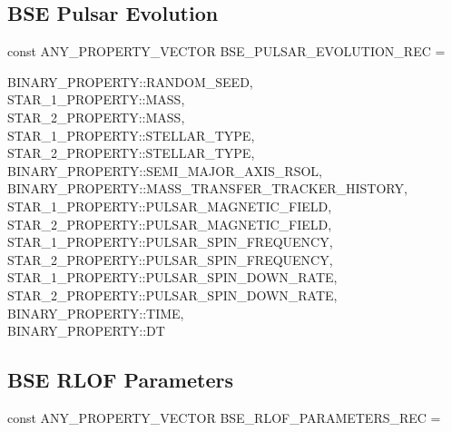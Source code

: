 \newpage
\subsection{BSE Pulsar Evolution}\label{sec:BSEPulsarEvolution}

const ANY\_PROPERTY\_VECTOR BSE\_PULSAR\_EVOLUTION\_REC = \lcb

\hfill
\begin{minipage}{\dimexpr\textwidth-2em}
    BINARY\_PROPERTY::RANDOM\_SEED, \\
    STAR\_1\_PROPERTY::MASS, \\
    STAR\_2\_PROPERTY::MASS, \\
    STAR\_1\_PROPERTY::STELLAR\_TYPE, \\
    STAR\_2\_PROPERTY::STELLAR\_TYPE, \\
    BINARY\_PROPERTY::SEMI\_MAJOR\_AXIS\_RSOL, \\
    BINARY\_PROPERTY::MASS\_TRANSFER\_TRACKER\_HISTORY, \\
    STAR\_1\_PROPERTY::PULSAR\_MAGNETIC\_FIELD, \\
    STAR\_2\_PROPERTY::PULSAR\_MAGNETIC\_FIELD, \\
    STAR\_1\_PROPERTY::PULSAR\_SPIN\_FREQUENCY, \\
    STAR\_2\_PROPERTY::PULSAR\_SPIN\_FREQUENCY, \\
    STAR\_1\_PROPERTY::PULSAR\_SPIN\_DOWN\_RATE, \\
    STAR\_2\_PROPERTY::PULSAR\_SPIN\_DOWN\_RATE, \\
    BINARY\_PROPERTY::TIME, \\
    BINARY\_PROPERTY::DT
\end{minipage}
\par\rcb{;}

\newpage
\subsection{BSE RLOF Parameters}\label{sec:BSERLOFParameters}

const ANY\_PROPERTY\_VECTOR BSE\_RLOF\_PARAMETERS\_REC = \lcb

